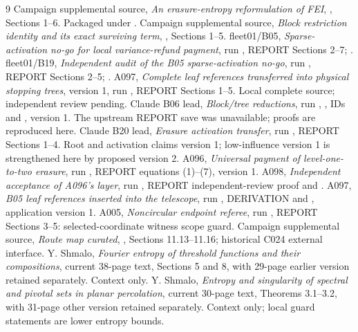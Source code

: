 \documentclass[11pt]{article}
\begin{document}
\begin{thebibliography}{9}
 Campaign supplemental source,
\emph{An erasure-entropy reformulation of FEI},
, Sections 1--6.
Packaged under .
 Campaign supplemental source,
\emph{Block restriction identity and its exact surviving term},
, Sections 1--5.
 fleet01/B05,
\emph{Sparse-activation no-go for local variance-refund payment},
run ,
REPORT Sections 2--7;
.
 fleet01/B19,
\emph{Independent audit of the B05 sparse-activation no-go},
run ,
REPORT Sections 2--5;
.
 A097, \emph{Complete leaf references transferred into physical
stopping trees}, version 1,
run ,
REPORT Sections 1--5. Local complete source; independent review pending.
 Claude B06 lead, \emph{Block/tree reductions},
run ,
, IDs  and
, version 1.
The upstream REPORT save was unavailable; proofs are reproduced here.
 Claude B20 lead, \emph{Erasure activation transfer},
run ,
REPORT Sections 1--4. Root and activation claims version 1;
low-influence version 1 is strengthened here by proposed version 2.
 A096, \emph{Universal payment of level-one-to-two erasure},
run ,
REPORT equations (1)--(7), version 1.
 A098, \emph{Independent acceptance of A096's layer},
run ,
REPORT independent-review proof and .
 A097, \emph{B05 leaf references inserted into the telescope},
run ,
DERIVATION and , application version 1.
 A005, \emph{Noncircular endpoint referee},
run ,
REPORT Sections 3--5: selected-coordinate witness scope guard.
 Campaign supplemental source,
\emph{Route map curated}, ,
Sections 11.13--11.16; historical C024 external interface.
 Y. Shmalo, \emph{Fourier entropy of threshold functions and
their compositions}, current 38-page text, Sections 5 and 8,
with 29-page earlier version retained separately. Context only.
 Y. Shmalo, \emph{Entropy and singularity of spectral and
pivotal sets in planar percolation}, current 30-page text,
Theorems 3.1--3.2, with 31-page other version retained separately.
Context only; local guard statements are lower entropy bounds.


\end{thebibliography}
\end{document}
